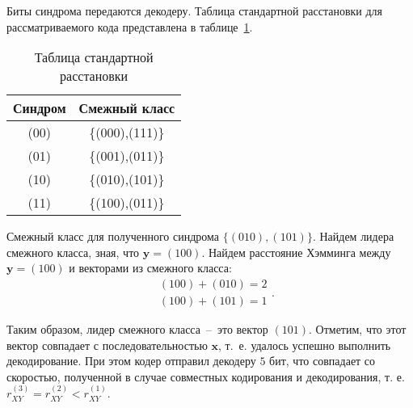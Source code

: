 \begin{enumerate}
Биты синдрома передаются декодеру. Таблица стандартной расстановки для рассматриваемого кода представлена в таблице~\ref{tab:Cosets}.
\begin{table}[!h]
    \caption{Таблица стандартной расстановки}
    \begin{center}
        \label{tab:Cosets}
        \begin{tabular}{|c|c|}
            \hline
            Синдром & Смежный класс \\
            \hline
            (00) & \{(000),(111)\} \\ 
            \hline
            (01) & \{(001),(011)\} \\ 
            \hline
            (10) & \{(010),(101)\} \\ 
            \hline
            (11) & \{(100),(011)\} \\ 
            \hline
        \end{tabular}
    \end{center}
\end{table}

Смежный класс для полученного синдрома $\{(010),(101)\}$. Найдем лидера смежного класса, зная, что $\mathbf{y}=(100)$. Найдем расстояние Хэмминга между $\mathbf{y}=(100)$ и векторами из смежного класса:
\begin{equation*}
\begin{split}
& (100) + (010) = 2 \\
& (100) + (101) = 1
\end{split}.
\end{equation*}

Таким образом, лидер смежного класса~--~это вектор $(101)$. Отметим, что этот вектор совпадает с последовательностью $\mathbf{x}$, т.~е. удалось успешно выполнить декодирование. При этом кодер отправил декодеру $5$ бит, что совпадает со скоростью, полученной в случае совместных кодирования и декодирования, т. е. $r_{XY}^{(3)}=r_{XY}^{(2)} < r_{XY}^{(1)}$.

\end{enumerate}

